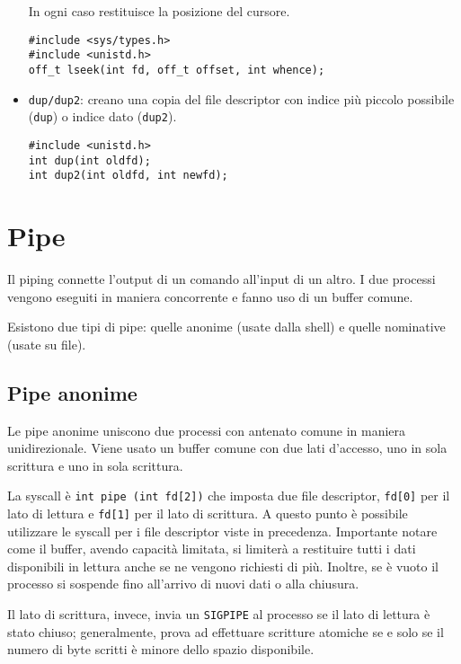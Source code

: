 \documentclass[11pt]{article}
\begin{document}
\begin{itemize}
In ogni caso restituisce la posizione del cursore.

\begin{verbatim}
#include <sys/types.h>
#include <unistd.h>
off_t lseek(int fd, off_t offset, int whence);
\end{verbatim}

\item \verb|dup/dup2|: creano una copia del file descriptor con indice più piccolo possibile (\verb|dup|) o indice dato (\verb|dup2|).

\begin{verbatim}
#include <unistd.h>
int dup(int oldfd);
int dup2(int oldfd, int newfd);
\end{verbatim}    
\end{itemize}

\section{Pipe}

Il piping connette l'output di un comando all'input di un altro. I due processi vengono eseguiti in maniera concorrente e fanno uso di un buffer comune.

Esistono due tipi di pipe: quelle anonime (usate dalla shell) e quelle nominative (usate su file).

\subsection{Pipe anonime}

Le pipe anonime uniscono due processi con antenato comune in maniera unidirezionale. Viene usato un buffer comune con due lati d'accesso, uno in sola scrittura e uno in sola scrittura.

La syscall è \verb|int pipe (int fd[2])| che imposta due file descriptor, \verb|fd[0]| per il lato di lettura e \verb|fd[1]| per il lato di scrittura. A questo punto è possibile utilizzare le syscall per i file descriptor viste in precedenza. Importante notare come il buffer, avendo capacità limitata, si limiterà a restituire tutti i dati disponibili in lettura anche se ne vengono richiesti di più. Inoltre, se è vuoto il processo si sospende fino all'arrivo di nuovi dati o alla chiusura.

Il lato di scrittura, invece, invia un \verb|SIGPIPE| al processo se il lato di lettura è stato chiuso; generalmente, prova ad effettuare scritture atomiche se e solo se il numero di byte scritti è minore dello spazio disponibile.
\end{document}
